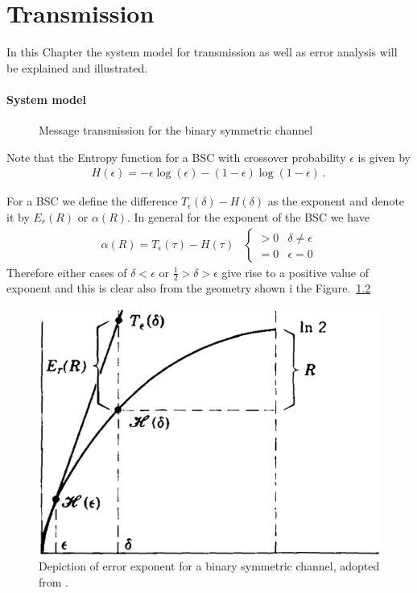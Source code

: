 \chapter{Transmission}
In this Chapter the system model for transmission as well as error analysis will be explained and illustrated.
\label{Ch.SystemModel}
\subsubsection{System model}
\begin{figure}[!htb]
    \centering
	
	\caption{Message transmission for the binary symmetric channel}
	\label{Fig.BSC_Channel}
\end{figure}
Note that the Entropy function for a BSC with crossover probability $\epsilon$ is given by 
\begin{align}
  H(\epsilon) =  -\epsilon \log(\epsilon)-(1-\epsilon)\log(1-\epsilon) \,.\,
\end{align}
\begin{remark}
For a BSC we define the difference $T_{\epsilon}(\delta) - H(\delta)$ as the exponent and denote it by $E_r(R)$ or $\alpha(R)$. In general for the exponent of the BSC we have 
%
\begin{align}
    \alpha(R) = T_{\epsilon}(\tau) - H(\tau) &\begin{cases}
    > 0 &\text{$\delta \neq \epsilon$}\\
    = 0      &\text{$\epsilon = 0$} 
    \end{cases}
\end{align}
%
Therefore either cases of $\delta < \epsilon$ or $\frac{1}{2}>\delta > \epsilon$ give rise to a positive value of exponent and this is clear also from the geometry shown i the Figure.~\ref{Fig.Entropy2}
\end{remark}

\begin{figure}[t]
    \centering
    \includegraphics[scale=.25]{Fig/Entropy2.png}
    \caption{Depiction of error exponent for a binary symmetric channel, adopted from \cite{RG68}.}
    \label{Fig.Entropy2}
\end{figure}

